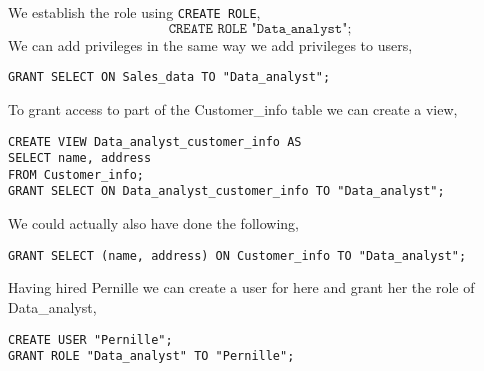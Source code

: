 \documentclass[working, oneside]{../../Preambles/tuftebook}
\begin{document}
\begin{solution}
We establish the role using \texttt{CREATE ROLE},
\[
\texttt{CREATE ROLE "Data\_analyst";}
\]
We can add privileges in the same way we add privileges to users,
\begin{lstlisting}
GRANT SELECT ON Sales_data TO "Data_analyst";
\end{lstlisting}
To grant access to part of the Customer\_info table we can create a view,
\begin{lstlisting}
CREATE VIEW Data_analyst_customer_info AS
SELECT name, address
FROM Customer_info;
GRANT SELECT ON Data_analyst_customer_info TO "Data_analyst";
\end{lstlisting}
We could actually also have done the following,
\begin{lstlisting}
GRANT SELECT (name, address) ON Customer_info TO "Data_analyst";
\end{lstlisting}
Having hired Pernille we can create a user for here and grant her the role of Data\_analyst,
\begin{lstlisting}
CREATE USER "Pernille";
GRANT ROLE "Data_analyst" TO "Pernille";
\end{lstlisting}
\end{solution}
\end{document}
